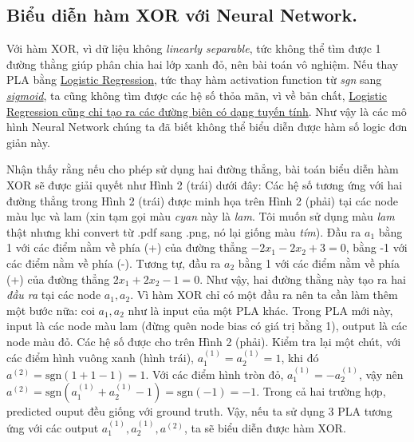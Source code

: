  
\subsection{Biểu diễn hàm XOR với Neural Network.}
 
Với hàm XOR, vì dữ liệu không \textit{linearly separable}, tức không thể tìm được 1 đường thằng giúp phân chia hai lớp xanh đỏ, nên bài toán vô nghiệm. Nếu thay PLA bằng \href{http://machinelearningcoban.com/2017/01/27/logisticregression/}{Logistic Regression}, tức thay hàm activation function từ \textit{sgn} sang \href{http://machinelearningcoban.com/2017/01/27/logisticregression/#sigmoid-function}{\textit{sigmoid}}, ta cũng không tìm được các hệ số thỏa mãn, vì về bản chất, \href{http://machinelearningcoban.com/2017/01/27/logisticregression/#boundary-tao-boi-logistic-regression-co-dang-tuyen-tinh}{Logistic Regression cũng chỉ tạo ra các đường biên có dạng tuyến tính}. Như vậy là các mô hình Neural Network chúng ta đã biết không thể biểu diễn được hàm số logic đơn giản này. 
 
Nhận thấy rằng nếu cho phép sử dụng hai đường thẳng, bài toán biểu diễn hàm XOR sẽ được giải quyết như Hình 2 (trái) dưới đây: 
Các hệ số tương ứng với hai đường thẳng trong Hình 2 (trái) được minh họa trên Hình 2 (phải) tại các node màu lục và lam (xin tạm gọi màu \textit{cyan} này là \textit{lam}. Tôi muốn sử dụng màu \textit{lam} thật nhưng khi convert từ .pdf sang .png, nó lại giống màu \textit{tím}). Đầu ra $a_1$ bằng 1 với các điểm nằm về phía (+) của đường thẳng $-2x_1 -2x_2 +3 = 0$, bằng -1 với các điểm nằm về phía (-). Tương tự, đầu ra $a_2$ bằng 1 với các điểm nằm về phía (+) của đường thẳng $2x_1 + 2x_2 - 1 = 0$. Như vậy, hai đường thằng này tạo ra hai \textit{đầu ra} tại các node $a_1, a_2$. Vì hàm XOR chỉ có một đầu ra nên ta cần làm thêm một bước nữa: coi $a_1, a_2$ như là input của một PLA khác. Trong PLA mới này, input là các node màu lam (đừng quên node bias có giá trị bằng 1), output là các node màu đỏ. Các hệ số được cho trên Hình 2 (phải). Kiểm tra lại một chút, với các điểm hình vuông xanh (hình trái), $a^{(1)}_1 = a^{(1)}_2 = 1$, khi đó $a^{(2)} = \text{sgn}(1 + 1 - 1) = 1$. Với các điểm hình tròn đỏ, $a^{(1)}_1 = -a^{(1)}_2$, vậy nên $a^{(2)} = \text{sgn}(a^{(1)}_1 + a^{(1)}_2 - 1) = \text{sgn}(-1) = -1$. Trong cả hai trường hợp, predicted ouput đều giống với ground truth. Vậy, nếu ta sử dụng 3 PLA tương ứng với các output $a^{(1)}_1, a^{(1)}_2, a^{(2)}$, ta sẽ biểu diễn được hàm XOR. 
 
